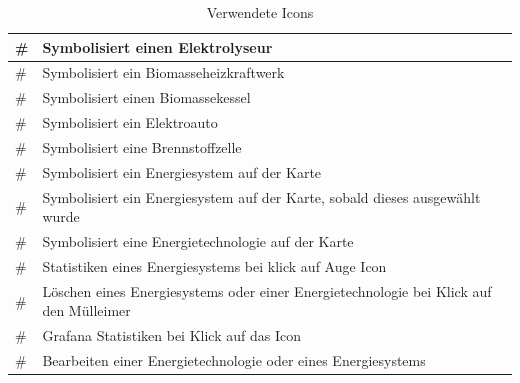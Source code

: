 \begin{table}[]
\begin{tabular}{|l|l|}
		\# & Symbolisiert einen Elektrolyseur                         \\ \hline
		\# & Symbolisiert ein Biomasseheizkraftwerk                   \\ \hline
		\# & Symbolisiert einen Biomassekessel                        \\ \hline
		\# & Symbolisiert ein Elektroauto                             \\ \hline
		\# & Symbolisiert eine Brennstoffzelle                        \\ \hline
		\# & Symbolisiert ein Energiesystem auf der Karte             \\ \hline
		\# & Symbolisiert ein Energiesystem auf der Karte, sobald dieses ausgewählt wurde           \\ \hline
		\# & Symbolisiert eine Energietechnologie auf der Karte       \\ \hline
		\# & Statistiken eines Energiesystems bei klick auf Auge Icon \\ \hline
		\# & Löschen eines Energiesystems oder einer Energietechnologie bei Klick auf den Mülleimer \\ \hline
		\# & Grafana Statistiken bei Klick auf das Icon               \\ \hline
		\# & Bearbeiten einer Energietechnologie oder eines Energiesystems                          \\ \hline
	\end{tabular}
	\caption{Verwendete Icons}
\label{tab: Verwendete Icons }
\end{table}
\newpage
